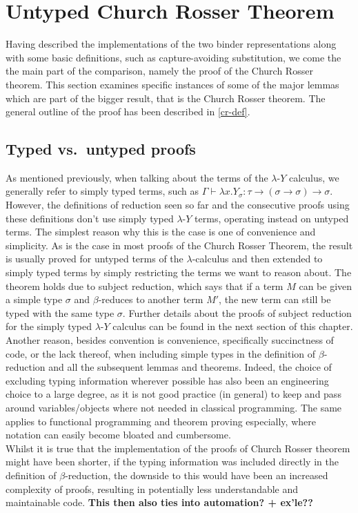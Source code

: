 \documentclass[a4paper, 12pt, twoside]{style/ociamthesis}
\theoremstyle{plain}
\theoremstyle{definition}
\theoremstyle{remark}
\newcommand{\lamy}{\lambda\text{-}Y}
\begin{document}
\section{Untyped Church Rosser
Theorem}\label{untyped-church-rosser-theorem}

Having described the implementations of the two binder representations
along with some basic definitions, such as capture-avoiding
substitution, we come the the main part of the comparison, namely the
proof of the Church Rosser theorem. This section examines specific
instances of some of the major lemmas which are part of the bigger
result, that is the Church Rosser theorem. The general outline of the
proof has been described in \cref{cr-def}.

\subsection{Typed vs.~untyped proofs}\label{typ-utyp}

\label{utypReason}

As mentioned previously, when talking about the terms of the \(\lamy\)
calculus, we generally refer to simply typed terms, such as
\(\Gamma \vdash \lambda x. Y_\sigma : \tau \to (\sigma \to \sigma) \to \sigma\).
However, the definitions of reduction seen so far and the consecutive
proofs using these definitions don't use simply typed \(\lamy\) terms,
operating instead on untyped terms. The simplest reason why this is the
case is one of convenience and simplicity. As is the case in most proofs
of the Church Rosser Theorem, the result is usually proved for untyped
terms of the \(\lambda\)-calculus and then extended to simply typed
terms by simply restricting the terms we want to reason about. The
theorem holds due to subject reduction, which says that if a term \(M\)
can be given a simple type \(\sigma\) and \(\beta\)-reduces to another
term \(M'\), the new term can still be typed with the same type
\(\sigma\). Further details about the proofs of subject reduction for
the simply typed \(\lamy\) calculus can be found in the next section of
this chapter.\\
Another reason, besides convention is convenience, specifically
succinctness of code, or the lack thereof, when including simple types
in the definition of \(\beta\)-reduction and all the subsequent lemmas
and theorems. Indeed, the choice of excluding typing information
wherever possible has also been an engineering choice to a large degree,
as it is not good practice (in general) to keep and pass around
variables/objects where not needed in classical programming. The same
applies to functional programming and theorem proving especially, where
notation can easily become bloated and cumbersome.\\
Whilst it is true that the implementation of the proofs of Church Rosser
theorem might have been shorter, if the typing information was included
directly in the definition of \(\beta\)-reduction, the downside to this
would have been an increased complexity of proofs, resulting in
potentially less understandable and maintainable code. \textbf{This then
also ties into automation? + ex'le??}
\end{document}
